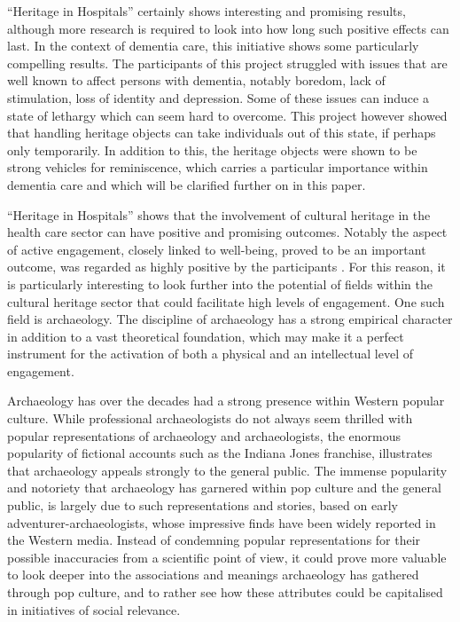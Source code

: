 “Heritage in Hospitals” certainly shows interesting and promising results, although more research is required to look into how long such positive effects can last. In the context of dementia care, this initiative shows some particularly compelling results. The participants of this project struggled with issues that are well known to affect persons with dementia, notably boredom, lack of stimulation, loss of identity and depression. 
Some of these issues can induce a state of lethargy which can seem hard to overcome. This project however showed that handling heritage objects can take individuals out of this state, if perhaps only temporarily. In addition to this, the heritage objects were shown to be strong vehicles for reminiscence, which carries a particular importance within dementia care and which will be clarified further on in this paper.	
	
	
	“Heritage in Hospitals” shows that the involvement of cultural heritage in the health care sector can have positive and promising outcomes. Notably the aspect of active engagement, closely linked to well-being, proved to be an important outcome, was regarded as highly positive by the participants \parencite[235--236]{AnderE_2013}. For this reason, it is particularly interesting to look further into the potential of fields within the cultural heritage sector that could facilitate high levels of engagement. One such field is archaeology. The discipline of archaeology has a strong empirical character in addition to a vast theoretical foundation, which may make it a perfect instrument for the activation of both a physical and an intellectual level of engagement.	
	
	
	Archaeology has over the decades had a strong presence within Western popular culture. While professional archaeologists do not always seem thrilled with popular representations of archaeology and archaeologists, the enormous popularity of fictional accounts such as the Indiana Jones franchise, illustrates that archaeology appeals strongly to the general public. The immense popularity and notoriety that archaeology has garnered within pop culture and the general public, is largely due to such representations and stories, based on early adventurer-archaeologists, whose impressive finds have been widely reported in the Western media. Instead of condemning popular representations for their possible inaccuracies from a scientific point of view, it could prove more valuable to look deeper into the associations and meanings archaeology has gathered through pop culture, and to rather see how these attributes could be capitalised in initiatives of social relevance.	
	

